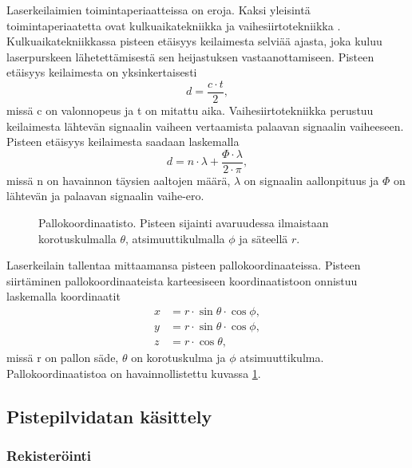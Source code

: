 Laserkeilaimien toimintaperiaatteissa on eroja. Kaksi yleisintä toimintaperiaatetta ovat kulkuaikatekniikka  ja vaihesiirtotekniikka . Kulkuaikatekniikkassa pisteen etäisyys keilaimesta selviää ajasta, joka kuluu laserpurskeen lähetettämisestä sen heijastuksen vastaanottamiseen. Pisteen etäisyys keilaimesta on yksinkertaisesti 
\begin{equation}
    d=\frac{c\cdot t}{2},    
\end{equation}
missä c on valonnopeus ja t on mitattu aika. \cite{fabritius}   
Vaihesiirtotekniikka perustuu keilaimesta lähtevän signaalin vaiheen vertaamista palaavan signaalin vaiheeseen. Pisteen etäisyys keilaimesta saadaan laskemalla 
\begin{equation}
    d=n\cdot \lambda + \frac{\Phi \cdot \lambda}{2 \cdot \pi},
\end{equation}
missä n on havainnon täysien aaltojen määrä, $\lambda$ on signaalin aallonpituus ja $\Phi$ on lähtevän ja palaavan signaalin vaihe-ero. \cite{fabritius}

\begin{figure}
    \centering
    
    \caption{Pallokoordinaatisto. Pisteen sijainti avaruudessa ilmaistaan korotuskulmalla $\theta$, atsimuuttikulmalla $\phi$ ja säteellä $r$.}
    \label{pallo}
\end{figure}{}

Laserkeilain tallentaa mittaamansa pisteen pallokoordinaateissa. Pisteen siirtäminen pallokoordinaateista karteesiseen koordinaatistoon onnistuu laskemalla koordinaatit 
\begin{equation}
    \begin{split}
        x&=r \cdot \sin \theta \cdot \cos \phi,\\ 
        y&=r \cdot \sin \theta \cdot \cos \phi,\\
        z&=r \cdot \cos \theta,    
    \end{split}
\end{equation}
missä r on pallon säde, $\theta$ on korotuskulma ja $\phi$ atsimuuttikulma. Pallokoordinaatistoa on havainnollistettu kuvassa \ref{pallo}.

\subsection{Pistepilvidatan käsittely}\label{workflow}

\subsubsection{Rekisteröinti}

